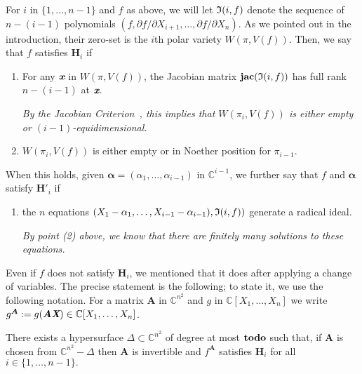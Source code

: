 \documentclass[sigconf]{acmart}
\def\td{{\bf todo}}
\def\Xb{\textit{\textbf{X}}}
\def\mA{{\bm A}}
\def\xb{\textit{\textbf{x}}}
\def\C{\mathbb{C}}
\def\jac{ \textbf{jac}}
\def\pa{\partial}
\def\D{\Delta}
\def\I{\frak{I}}
\begin{document}
For $i$ in $\{1,\dots,n-1\}$ and $f$ as above, we will let $\I(i, f)$
denote the sequence of $n-(i-1)$ polynomials $(f, {\pa f}/{\pa
  X_{i+1}},\dots,{\pa f}/{\pa X_n})$. As we pointed out in the
introduction, their zero-set is the $i$th polar variety $W(\pi,V(f))$.
Then, we say that $f$ satisfies $\textbf{H}_i$ if
\begin{enumerate}
\item For any $\xb$ in $W(\pi,V(f))$, the Jacobian matrix
  $\jac(\I(i, f))$ has full rank $n-(i-1)$ at $\xb$.

  {\em By the Jacobian Criterion~\cite[Corollary 16.20]{ECA}, this
  implies that $W(\pi_i,V(f))$ is either empty or $(i-1)$-equidimensional.}

\smallskip

\item $W(\pi_i,V(f))$ is either empty or in Noether position for
  $\pi_{i-1}$.
\end{enumerate}
When this holds, given $\bm \alpha = (\alpha_1,\hdots,\alpha_{i-1})$
in $\C^{i-1}$, we further say that $f$ and $\bm \alpha$ satisfy
$\textbf{H}'_i$ if
\begin{enumerate}
\item the $n$ equations
  $(X_1-\alpha_1,\dots,X_{i-1}-\alpha_{i-1}),\I(i, f))$ generate a
  radical ideal.

  {\em By point (2) above, we know that there are finitely many solutions 
    to these equations.}
\end{enumerate}

Even if $f$ does not satisfy $\textbf{H}_i$, we mentioned that it does
after applying a change of variables. The precise statement is the
following; to state it, we use the following notation. For a matrix
$\mA$ in $\C^{n^2}$ and $g$ in $\C[X_1,\hdots,X_n]$ we write
$g^\mA:=g(\mA \Xb) \in \C[X_1,\dots,X_n]$.


\begin{theorem}
  There exists a hypersurface $\D \subset \mathbb{C}^{n^2}$ of degree
  at most $\td$ such that, if $\mA$ is chosen from $\C^{n^2}-\Delta$
  then $\mA$ is invertible and $f^\mA$ satisfies $\textbf{H}_i$ for
  all $i \in \{1,\hdots,n-1\}.$
\end{theorem}
\end{document}
